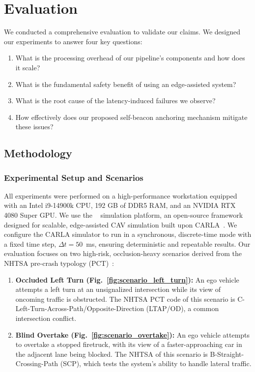 \section{Evaluation}
\label{sec:eval}

We conducted a comprehensive evaluation to validate our claims. We designed our experiments to answer four key questions: 
\begin {enumerate}
 \item What is the processing overhead of our pipeline's components and how does it scale?
 \item What is the fundamental safety benefit of using an edge-assisted system? 
 \item What is the root cause of the latency-induced failures we observe?
 \item How effectively does our proposed self-beacon anchoring mechanism mitigate these issues?
\end{enumerate}

\subsection{Methodology}

\subsubsection{Experimental Setup and Scenarios}
All experiments were performed on a high-performance workstation equipped with an Intel i9-14900k CPU, 192 GB of DDR5 RAM, and an NVIDIA RTX 4080 Super GPU. We use the \ecav~\cite{eCAV} simulation platform, an open-source framework designed for scalable, edge-assisted CAV simulation built upon CARLA~\cite{dosovitskiy_carla_nodate}. 
We configure the CARLA simulator to run in a synchronous, discrete-time mode with a fixed time step, $\Delta t = 50$~ms, ensuring deterministic and repeatable results. Our evaluation focuses on two high-risk, occlusion-heavy scenarios derived from the NHTSA pre-crash typology (PCT)~\cite{NHTSA_Typology}: 


\begin{enumerate}
    \item \textbf{Occluded Left Turn (Fig.~\ref{fig:scenario_left_turn}):} An ego vehicle attempts a left turn at an unsignalized intersection while its view of oncoming traffic is obstructed. The NHTSA PCT code of this scenario is C-Left-Turn-Across-Path/Opposite-Direction (LTAP/OD), a common intersection conflict. 
    \item \textbf{Blind Overtake (Fig.~\ref{fig:scenario_overtake}):} An ego vehicle attempts to overtake a stopped firetruck, with its view of a faster-approaching car in the adjacent lane being blocked. The NHTSA of this scenario is B-Straight-Crossing-Path (SCP), which tests the system's ability to handle lateral traffic.
\end{enumerate}


